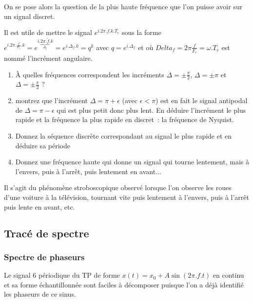 \documentclass[a4paper,twoside,12pt]{report}           %
\begin{document}
 On se pose alors la question de la plus haute fréquence que l'on
 puisse avoir sur un signal discret.

 Il est utile de mettre le signal $e^{i.2\pi.f.k.T_e}$ sous la forme
 $e^{i.2\pi.\frac{f}{F_e}.k}=e^{i.\underbrace{2\pi.\widetilde{f}}_{\Delta_f}.k}=e^{i.\Delta_f.k}=q^k$
 avec $q=e^{i.\Delta_f}$ et où $Delta_f=2\pi\frac{f}{F_e}=\omega.T_e$
 est nommé l'incrément angulaire.

 \begin{enumerate}
 \item À quelles fréquences correspondent les incréments
   $\Delta=\pm\frac{\pi}{2}$, $\Delta=\pm\pi$ et
   $\Delta=\pm\frac{\pi}{2}$ ?
 \item montrez que l'incrément $\Delta=\pi + \epsilon$ (avec
   $\epsilon<\pi$) est en fait le signal antipodal de
   $\Delta=\pi - \epsilon$ qui est plus petit donc plus lent. En
   déduire l'incrément le plus rapide et la fréquence la plus rapide
   en discret~: la fréquence de Nyquist.
 \item Donnez la séquence discrète correspondant au signal le plus
   rapide et en déduire sa période
 \item Donnez une fréquence haute qui donne un signal qui tourne
   lentement, mais à l'envers, puis à l'arrêt, puis lentement en
   avant...
 \end{enumerate}

 Il s'agit du phénomène stroboscopique observé lorsque l'on observe
 les roues d'une voiture à la télévision, tournant vite puis lentement
 à l'envers, puis à l'arrêt puis lente en avant, etc.
 

 \subsection{Tracé de spectre}
 
 \subsubsection{Spectre de phaseurs}
 
 Le signal 6 périodique du TP de forme $x(t) = x_0 + A \sin(2\pi.f.t)$
 en continu et sa forme échantillonnée sont faciles à décomposer
 puisque l'on a déjà identifié les phaseurs de ce sinus.
\end{document}
